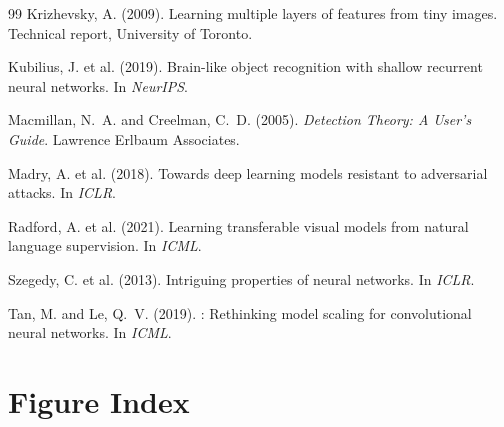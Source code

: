 \documentclass[12pt,a4paper]{article}
\begin{document}
\begin{thebibliography}{99}
Krizhevsky, A. (2009).
\newblock Learning multiple layers of features from tiny images.
\newblock Technical report, University of Toronto.

Kubilius, J. et al. (2019).
\newblock Brain-like object recognition with shallow recurrent neural networks.
\newblock In \emph{NeurIPS}.

Macmillan, N.~A. and Creelman, C.~D. (2005).
\newblock \emph{Detection Theory: A User's Guide}.
\newblock Lawrence Erlbaum Associates.

Madry, A. et al. (2018).
\newblock Towards deep learning models resistant to adversarial attacks.
\newblock In \emph{ICLR}.

Radford, A. et al. (2021).
\newblock Learning transferable visual models from natural language supervision.
\newblock In \emph{ICML}.

Szegedy, C. et al. (2013).
\newblock Intriguing properties of neural networks.
\newblock In \emph{ICLR}.

Tan, M. and Le, Q.~V. (2019).
: Rethinking model scaling for convolutional neural
  networks.
\newblock In \emph{ICML}.

\end{thebibliography}

\newpage
\appendix

\section{Figure Index}
\label{app:figures}
\end{document}
